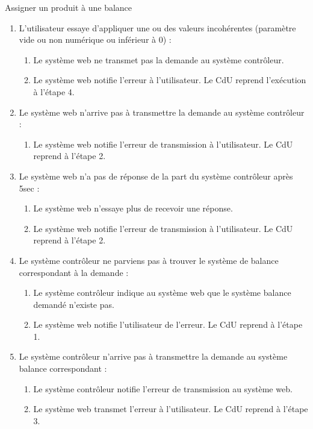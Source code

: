\begin{UseCase}{Assigner un produit à une balance}
\begin{UseCaseExtension}
\begin{enumerate}
        \item[4.a] L'utilisateur essaye d'appliquer une ou des valeurs
            incohérentes (paramètre vide ou non numérique ou inférieur à 0) :
            \begin{enumerate}
                \item Le système web ne transmet pas la demande au système
                    contrôleur.
                \item Le système web notifie l'erreur à l'utilisateur. Le CdU
                    reprend l'exécution à l'étape 4.
            \end{enumerate}

        \item[5.a] Le système web n'arrive pas à transmettre la demande au
            système contrôleur :
            \begin{enumerate}
                \item Le système web notifie l'erreur de transmission à
                    l'utilisateur. Le CdU reprend à l'étape 2.
            \end{enumerate}

        \item[5.b] Le système web n'a pas de réponse de la part du système
            contrôleur après 5sec :
            \begin{enumerate}
                \item Le système web n'essaye plus de recevoir une réponse.
                \item Le système web notifie l'erreur de transmission à
                    l'utilisateur. Le CdU reprend à l'étape 2.
            \end{enumerate}

        \item[6.a] Le système contrôleur ne parviens pas à trouver le système de balance correspondant à la demande :
            \begin{enumerate}
                \item Le système contrôleur indique au système web que le système balance demandé n'existe pas.
                \item Le système web notifie l'utilisateur de l'erreur. Le CdU reprend à l'étape 1.
            \end{enumerate}

        \item[6.b] Le système contrôleur n'arrive pas à transmettre la demande au système balance correspondant :
            \begin{enumerate}
                \item Le système contrôleur notifie l'erreur de transmission au système web.
                \item Le système web transmet l'erreur à l'utilisateur. Le CdU reprend à l'étape 3.
            \end{enumerate}


\end{enumerate}
\end{UseCaseExtension}
\end{UseCase}
